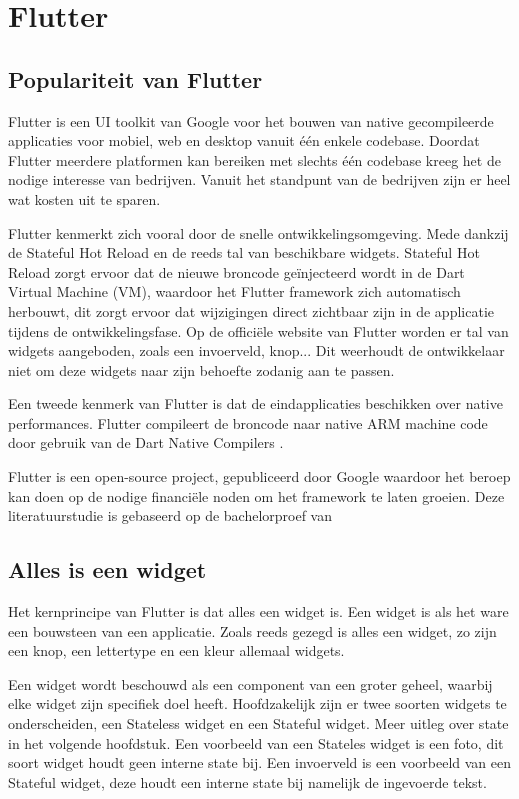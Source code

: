 \section{Flutter}
\subsection{Populariteit van Flutter}
Flutter is een UI toolkit van Google voor het bouwen van native gecompileerde applicaties voor mobiel, web en desktop vanuit één enkele codebase. Doordat Flutter meerdere platformen kan bereiken met slechts één codebase kreeg het de nodige interesse van bedrijven. Vanuit het standpunt van de bedrijven zijn er heel wat kosten uit te sparen.

Flutter kenmerkt zich vooral door de snelle ontwikkelingsomgeving. Mede dankzij de Stateful Hot Reload en de reeds tal van beschikbare widgets. Stateful Hot Reload zorgt ervoor dat de nieuwe broncode geïnjecteerd wordt in de Dart Virtual Machine (VM), waardoor het Flutter framework zich automatisch herbouwt, dit zorgt ervoor dat wijzigingen direct zichtbaar zijn in de applicatie tijdens de ontwikkelingsfase. Op de officiële website van Flutter worden er tal van widgets aangeboden, zoals een invoerveld, knop... Dit weerhoudt de ontwikkelaar niet om deze widgets naar zijn behoefte zodanig aan te passen.

Een tweede kenmerk van Flutter is dat de eindapplicaties beschikken over native performances. Flutter compileert de broncode naar native ARM machine code door gebruik van de Dart Native Compilers \autocite{Dart}.

Flutter is een open-source project, gepubliceerd door Google waardoor het beroep kan doen op de nodige financiële noden om het framework te laten groeien. 
Deze literatuurstudie is gebaseerd op de bachelorproef van \autocite{Coninck2019}

\subsection{Alles is een widget}
Het kernprincipe van Flutter is dat alles een widget is. Een widget is als het ware een bouwsteen van een applicatie. Zoals reeds gezegd is alles een widget, zo zijn een knop, een lettertype en een kleur allemaal widgets. 

Een widget wordt beschouwd als een component van een groter geheel, waarbij elke widget zijn specifiek doel heeft.
Hoofdzakelijk zijn er twee soorten widgets te onderscheiden, een Stateless widget en een Stateful widget. Meer uitleg over state in het volgende hoofdstuk. Een voorbeeld van een Stateles widget is een foto, dit soort widget houdt geen interne state bij. Een invoerveld is een voorbeeld van een Stateful widget, deze houdt een interne state bij namelijk de ingevoerde tekst. 
\newline

